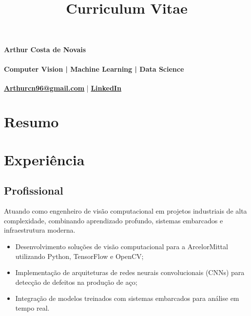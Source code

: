 \documentclass[10pt, a4paper, roman]{moderncv} %
\title{Curriculum Vitae}
\begin{document}
\makecvtitle %

{\LARGE \hspace{2.15cm}\textbf{Arthur Costa de Novais} \\  \\}
\vspace{.3cm}
{\Large\hspace{2cm} \textbf{Computer Vision | Machine Learning | Data Science} \\  \\}
\vspace{0.2cm}
\hspace{2cm} 
\textbf{\href{mailto:arthurcn96@gmail.com}{Arthurcn96@gmail.com}} | 
\textbf{\href{https://www.linkedin.com/in/arthur-novais-201420}{LinkedIn} }

\vspace{0.2cm}

\section{Resumo}
\vspace{0.2cm}

\vspace{0.5cm}

\section{Experiência}

\subsection{Profissional}

\vspace{0.2cm}
{
    Atuando como engenheiro de visão computacional em projetos industriais de alta complexidade, combinando aprendizado profundo, sistemas embarcados e infraestrutura moderna.\\
    \begin{itemize}
      \item Desenvolvimento soluções de visão computacional para a ArcelorMittal utilizando Python, TensorFlow e OpenCV;
      \item Implementação de arquiteturas de redes neurais convolucionais (CNNs) para detecção de defeitos na produção de aço;
      \item Integração de modelos treinados com sistemas embarcados para análise em tempo real.
    \end{itemize}
}
\end{document}

